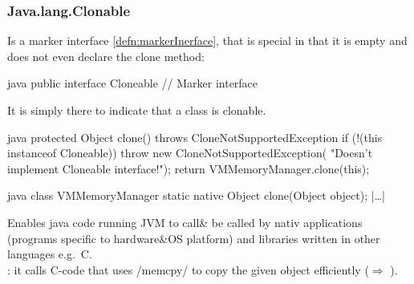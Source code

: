 \subsubsection{Java.lang.Clonable}
\label{subsubsec:Java.lang.Clonable}
\begin{defnbox}\nospacing
  \begin{defn}[Clonable]\label{defn:}
    Is a marker interface \cref{defn:markerInerface}, that is special in that
    it is empty and does not even declare the clone method:
    \begin{mintlinebox}{java}
      public interface Cloneable {
        // Marker interface
      }
    \end{mintlinebox}
    It is simply there to indicate that a class is clonable.
  \end{defn}
\end{defnbox}
\begin{codeboxNl}{java}
protected Object clone() throws CloneNotSupportedException {
  if (!(this instanceof Cloneable)) {
    throw new CloneNotSupportedException(
      "Doesn't implement Cloneable interface!");
  }
  return VMMemoryManager.clone(this);
}
\end{codeboxNl}
\begin{codeboxNl}[VMMemoryManager]{java}
  class VMMemoryManager {
    static native Object clone(Object object);
    |\ldots|
  }
\end{codeboxNl}
\begin{defnbox}\nospacing
  \begin{defn}
    Enables java code running JVM to call\& be called by nativ applications
    (programs specific to hardware\&OS platform) and libraries written in other
    languages e.g.\ C.\\
    : it calls C-code that uses \cppinline/memcpy/ to
    copy the given object  efficiently ($\Rightarrow$ ).
  \end{defn}
\end{defnbox}
